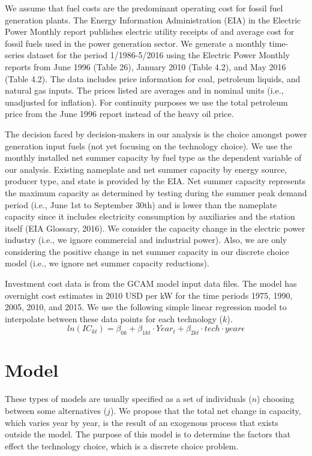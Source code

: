 \documentclass[10pt]{amsart}
\begin{document}
We assume that fuel costs are the predominant operating cost for fossil fuel generation plants.
The Energy Information Administration (EIA) in the Electric Power Monthly report publishes electric utility receipts of and average cost for fossil fuels used in the power generation sector.
We generate a monthly time-series dataset for the period 1/1986-5/2016 using the Electric Power Monthly reports from June 1996 (Table 26), January 2010 (Table 4.2), and May 2016 (Table 4.2). 
The data includes price information for coal, petroleum liquids, and natural gas inputs.
The prices listed are averages and in nominal units (i.e., unadjusted for inflation).
For continuity purposes we use the total petroleum price from the June 1996 report instead of the heavy oil price.  

The decision faced by decision-makers in our analysis is the choice amongst power generation input fuels (not yet focusing on the technology choice). 
We use the monthly installed net summer capacity by fuel type as the dependent variable of our analysis. 
Existing nameplate and net summer capacity by energy source, producer type, and state is provided by the EIA.
Net summer capacity represents the maximum capacity as determined by testing during the summer peak demand period (i.e., June 1st to September 30th) and is lower than the nameplate capacity since it includes electricity consumption by auxiliaries and the station itself \parencite{}(EIA Glossary, 2016). 
We consider the capacity change in the electric power industry (i.e., we ignore commercial and industrial power).  
Also, we are only considering the positive change in net summer capacity in our discrete choice model (i.e., we ignore net summer capacity reductions). 

Investment cost data is from the GCAM model input data files.
The model has overnight cost estimates in 2010 USD per kW for the time periods 1975, 1990, 2005, 2010, and 2015. 
We use the following simple linear regression model to interpolate between these data points for each technology ($k$). 
\begin{equation}
ln(IC_{kt}) = \beta_{0k} + \beta_{1kt} \cdot Year_{t} + \beta_{2kt} \cdot tech \cdot year \epsilon
\end{equation}



\section{Model}
These types of models are usually specified as a set of individuals ($n$) choosing between some alternatives ($j$).
We propose that the total net change in capacity, which varies year by year, is the result of an exogenous process that exists outside the model. 
The purpose of this model is to determine the factors that effect the technology choice, which is a discrete choice problem.
\end{document}
